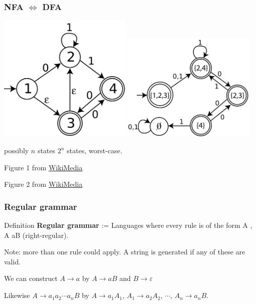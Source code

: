 \documentclass[languages_and_machines.tex]{subfiles}
\begin{document}
\begin{frame}
  \frametitle{NFA \(\iff\) DFA}

  \includegraphics[width=0.48\textwidth]{nfa-powerset.png}
  \includegraphics[width=0.48\textwidth]{dfa-powerset.png}

  \pause

  possibly \(n\) states \pro \(2^n\) states, worst-case.

  {\tiny
    Figure 1 from \href{https://commons.wikimedia.org/wiki/File:NFA-powerset-construction-example.svg}{WikiMedia}

    Figure 2 from \href{https://commons.wikimedia.org/wiki/File:DFA-powerset-construction-example.svg}{WikiMedia}
  }
\end{frame}

\begin{frame}
  \frametitle{Regular grammar}

  \begin{block}{Definition}
    \textbf{Regular grammar} := Languages where every rule is of the form A \pro \emptystr, A \pro aB (right-regular).
  \end{block}

  \pause

  Note: more than one rule could apply. A string is generated if any of these are valid.

  We can construct \(A \to a\) by \pause \(A \to a B\) and \(B \to \varepsilon\)

  Likewise \(A \to a_1 a_2 \dotsb a_n B\) by \pause \(A \to a_1 A_1\), \(A_1 \to a_2 A_2\), \(\dotsb\), \(A_n \to a_n B\).

\end{frame}
\end{document}
